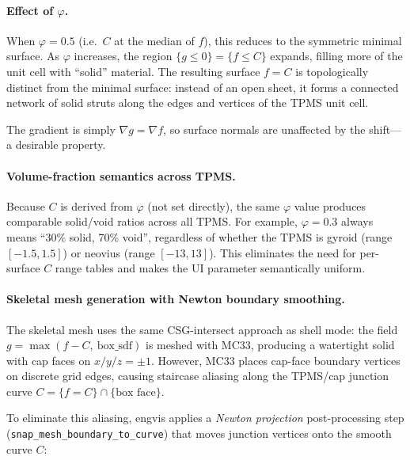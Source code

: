 \documentclass[11pt]{article}
\begin{document}
\paragraph{Effect of $\varphi$.}
When $\varphi = 0.5$ (i.e.\ $C$ at the median of $f$), this reduces
to the symmetric minimal surface.  As $\varphi$ increases, the region
$\{g \le 0\} = \{f \le C\}$ expands, filling more of the unit cell
with ``solid'' material.  The resulting surface $f = C$ is
topologically distinct from the minimal surface: instead of an open
sheet, it forms a connected network of solid struts along the edges
and vertices of the TPMS unit cell.

The gradient is simply $\nabla g = \nabla f$, so surface normals are
unaffected by the shift---a desirable property.

\paragraph{Volume-fraction semantics across TPMS.}
Because $C$ is derived from $\varphi$ (not set directly), the same
$\varphi$ value produces comparable solid/void ratios across all
TPMS.  For example, $\varphi=0.3$ always means ``30\% solid, 70\%
void'', regardless of whether the TPMS is gyroid (range $[-1.5,1.5]$)
or neovius (range $[-13,13]$).  This eliminates the need for
per-surface $C$ range tables and makes the UI parameter
semantically uniform.

\paragraph{Skeletal mesh generation with Newton boundary smoothing.}
\label{sec:skeletal-mesh}
The skeletal mesh uses the same CSG-intersect approach as shell mode:
the field $g = \max(f - C,\ \text{box\_sdf})$ is meshed with MC33,
producing a watertight solid with cap faces on $x/y/z = \pm 1$.
However, MC33 places cap-face boundary vertices on discrete grid
edges, causing staircase aliasing along the TPMS/cap junction curve
$C = \{f = C\} \cap \{\text{box face}\}$.

To eliminate this aliasing, engvis applies a \emph{Newton projection}
post-processing step (\texttt{snap\_mesh\_boundary\_to\_curve}) that
moves junction vertices onto the smooth curve $C$:
\end{document}
